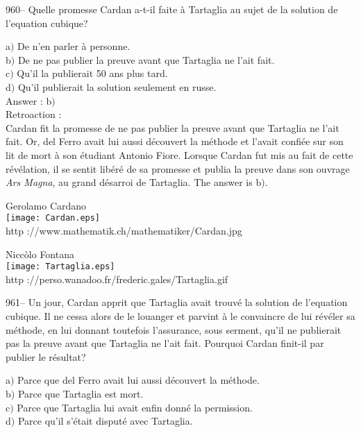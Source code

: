 ﻿\documentclass[letterpaper, 12pt]{article}
\begin{document}
960-- Quelle promesse Cardan a-t-il faite \`a Tartaglia au sujet de
la solution de l'equation cubique?

a$)$ De n'en parler \`a personne.\\
b$)$ De ne pas publier la preuve avant que Tartaglia ne l'ait fait.  \\
c$)$ Qu'il la publierait 50 ans plus tard.  \\
d$)$ Qu'il publierait la solution seulement en russe. \\

Answer : b$)$\\

Retroaction :\\
Cardan fit la promesse de ne pas publier la preuve avant que
Tartaglia ne l'ait fait. Or, del Ferro avait lui aussi d\'ecouvert
la m\'ethode et l'avait confi\'ee sur son lit de mort \`a son
\'etudiant Antonio Fiore. Lorsque Cardan fut mis au fait de cette
r\'ev\'elation,
il se sentit lib\'er\'e de sa promesse et publia la preuve dans son ouvrage
{\sl Ars Magna}, au grand d\'esarroi de Tartaglia. The answer is b$)$.\\
        \begin{center}
        Gerolamo Cardano\\
    \texttt{[image: Cardan.eps]}\\
        {\footnotesize http ://www.mathematik.ch/mathematiker/Cardan.jpg}
    \end{center}

        \begin{center}
        Nicc\`olo Fontana\\
    \texttt{[image: Tartaglia.eps]}\\
        {\footnotesize http
://perso.wanadoo.fr/frederic.gales/Tartaglia.gif}
    \end{center}

961-- Un jour, Cardan apprit que Tartaglia avait trouv\'e la
solution de l'equation cubique. Il ne cessa alors de le louanger
et parvint \`a le convaincre de lui r\'ev\'eler sa m\'ethode, en lui
donnant toutefois l'assurance, sous serment, qu'il ne publierait pas
la preuve avant que Tartaglia ne l'ait fait. Pourquoi Cardan
finit-il par publier le r\'esultat?

a$)$ Parce que del Ferro avait lui aussi d\'ecouvert la m\'ethode. \\
b$)$ Parce que Tartaglia est mort.  \\
c$)$ Parce que Tartaglia lui avait enfin donn\'e la permission.  \\
d$)$ Parce qu'il s'\'etait disput\'e avec Tartaglia. \\
\end{document}
